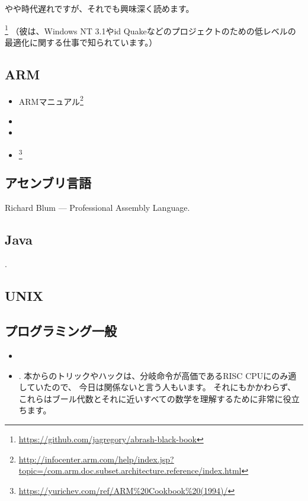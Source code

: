 やや時代遅れですが、それでも興味深く読めます。

\MAbrash\footnote{\AlsoAvailableAs \url{https://github.com/jagregory/abrash-black-book}}
（彼は、Windows NT 3.1やid Quakeなどのプロジェクトのための低レベルの最適化に関する仕事で知られています。）

\subsection{ARM}

\begin{itemize}
\item ARMマニュアル\footnote{\AlsoAvailableAs \url{http://infocenter.arm.com/help/index.jsp?topic=/com.arm.doc.subset.architecture.reference/index.html}}

\item \ARMSevenRef

\item \ARMSixFourRefURL

\item \ARMCookBook\footnote{\AlsoAvailableAs \url{https://yurichev.com/ref/ARM%20Cookbook%20(1994)/}}
\end{itemize}

\subsection{アセンブリ言語}

Richard Blum --- Professional Assembly Language.

\subsection{Java}

\JavaBook.

\subsection{UNIX}

\TAOUP

\subsection{プログラミング一般}

\begin{itemize}

\item \RobPikePractice

\item \HenryWarren.
本からのトリックやハックは、分岐命令が高価である\ac{RISC} \ac{CPU}にのみ適していたので、
今日は関係ないと言う人もいます。 
それにもかかわらず、これらはブール代数とそれに近いすべての数学を理解するために非常に役立ちます。

\end{itemize}


